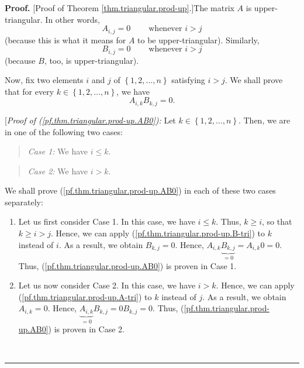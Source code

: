 \documentclass[numbers=enddot,12pt,final,onecolumn,notitlepage]{scrartcl}%
\theoremstyle{definition}
\newenvironment{statement}{\begin{quote}}{\end{quote}}
\newenvironment{proof}[1][Proof]{\noindent\textbf{#1.} }{\ \rule{0.5em}{0.5em}}
\begin{document}
\begin{proof}
[Proof of Theorem \ref{thm.triangular.prod-up}.]The matrix $A$ is
upper-triangular. In other words,%
\begin{equation}
A_{i,j}=0\ \ \ \ \ \ \ \ \ \ \text{whenever }i>j
\label{pf.thm.triangular.prod-up.A-tri}%
\end{equation}
(because this is what it means for $A$ to be upper-triangular). Similarly,%
\begin{equation}
B_{i,j}=0\ \ \ \ \ \ \ \ \ \ \text{whenever }i>j
\label{pf.thm.triangular.prod-up.B-tri}%
\end{equation}
(because $B$, too, is upper-triangular).

Now, fix two elements $i$ and $j$ of $\left\{  1,2,\ldots,n\right\}  $
satisfying $i>j$. We shall prove that for every $k\in\left\{  1,2,\ldots
,n\right\}  $, we have
\begin{equation}
A_{i,k}B_{k,j}=0. \label{pf.thm.triangular.prod-up.AB0}%
\end{equation}


[\textit{Proof of (\ref{pf.thm.triangular.prod-up.AB0}):} Let $k\in\left\{
1,2,\ldots,n\right\}  $. Then, we are in one of the following two cases:

\begin{statement}
\textit{Case 1:} We have $i\leq k$.
\end{statement}

\begin{statement}
\textit{Case 2:} We have $i>k$.
\end{statement}

We shall prove (\ref{pf.thm.triangular.prod-up.AB0}) in each of these two
cases separately:

\begin{enumerate}
\item Let us first consider Case 1. In this case, we have $i\leq k$. Thus,
$k\geq i$, so that $k\geq i>j$. Hence, we can apply
(\ref{pf.thm.triangular.prod-up.B-tri}) to $k$ instead of $i$. As a result, we
obtain $B_{k,j}=0$. Hence, $A_{i,k}\underbrace{B_{k,j}}_{=0}=A_{i,k}0=0$.
Thus, (\ref{pf.thm.triangular.prod-up.AB0}) is proven in Case 1.

\item Let us now consider Case 2. In this case, we have $i>k$. Hence, we can
apply (\ref{pf.thm.triangular.prod-up.A-tri}) to $k$ instead of $j$. As a
result, we obtain $A_{i,k}=0$. Hence, $\underbrace{A_{i,k}}_{=0}%
B_{k,j}=0B_{k,j}=0$. Thus, (\ref{pf.thm.triangular.prod-up.AB0}) is proven in
Case 2.
\end{enumerate}


\end{proof}
\end{document}
